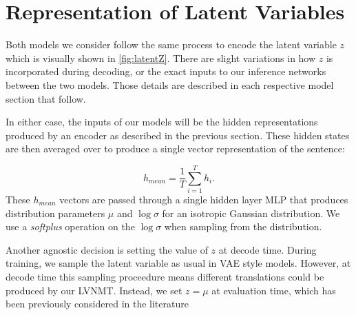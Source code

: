 \section{Representation of Latent Variables}

Both models we consider follow the same process to encode the latent variable $z$ which is visually shown in \ref{fig:latentZ}. There are slight variations in how $z$ is incorporated during decoding, or the exact inputs to our inference networks between the two models. Those details are described in each respective model section that follow. 

In either case, the inputs of our models will be the hidden representations produced by an encoder as described in the previous section. These hidden states are then averaged over to produce a single vector representation of the sentence:

\begin{equation}
h_{mean} = \frac{1}{T} \sum_{i=1}^{T} h_{i}.
\end{equation}
These $h_{mean}$ vectors are passed through a single hidden layer \ac{MLP} that produces distribution parameters $\mu$ and $\log \sigma$ for an isotropic Gaussian distribution. We use a \textit{softplus} operation on the $\log\sigma$ when sampling from the distribution. 

Another agnostic decision is setting the value of $z$ at decode time. During training, we sample the latent variable as usual in VAE style models. However, at decode time this sampling proceedure means different translations could be produced by our \ac{LVNMT}. Instead, we set $z=\mu$ at evaluation time, which has been previously considered in the literature \cite{Zhang2016VNMT, eikema2018AEVNMT}


